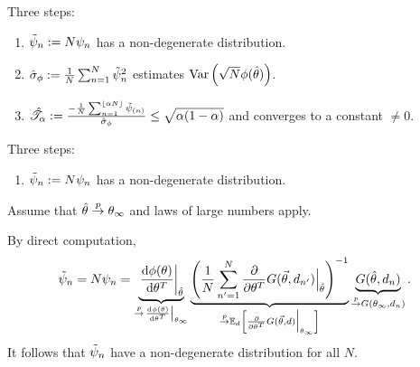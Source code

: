 
\begin{frame}[t]{Three steps:}
%
\begin{enumerate}
    \item $\tilde{\psi}_n := N \psi_n$ has a non-degenerate distribution.
    \item $\hat\sigma_{\phi} := \frac{1}{N}\sum_{n=1}^N \tilde{\psi}_n^2$ estimates
        $\underset{}{\mathrm{Var}}\left(\sqrt{N}\phi(\hat{\theta})\right)$.
    \item $\hat{\mathscr{T}}_\alpha :=
        \frac{-\frac{1}{N}\sum_{n=1}^{\lfloor \alpha N \rfloor}
            \tilde{\psi}_{(n)}
        }
        {\hat\sigma_{\phi}}
        \le \sqrt{\alpha(1-\alpha)}$ and
        converges to a constant $\ne 0$.
\end{enumerate}

\end{frame}




\begin{frame}[t]{Three steps:}
%
\begin{enumerate}
    \item $\tilde{\psi}_n := N \psi_n$ has a non-degenerate distribution.
\end{enumerate}

Assume that $\hat{\theta} \overset{p}{\rightarrow} \theta_{\infty}$ and laws of large numbers apply.

By direct computation,
%
\begin{align*}
%
\inflbar_n = N \infl_n =
\underbrace{
\fracat{\dee \thetafun(\theta)}
    {\dee \theta^T}{\thetahat}
}_{
\plim
\fracat{\dee \thetafun(\theta)}
    {\dee \theta^T}{\thetalim}
}
\underbrace{
\left(
  \frac{1}{N}
  \sum_{n'=1}^N
    \frac{\partial}{\partial \theta^T} G(\vec\theta, \d_{n'})
        \Big\vert_{\thetahat}
\right)^{-1}
}_{
\plim \expect{\d}{
    \frac{\partial}{\partial \theta^T} G(\vec\theta, \d)
    \Big\vert_{\thetalim}
    }
}
\underbrace{
G(\thetahat, \d_{n})
}_{
\plim G(\thetalim, \d_{n})
}.
%
\end{align*}
%
It follows that $\tilde{\psi}_n$ have a non-degenerate distribution
for all $N$.

\end{frame}



